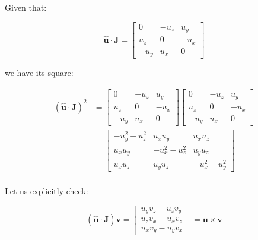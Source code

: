 \documentclass[12pt]{article}
\begin{document}



\pagebreak
\section*{}


Given that:

\begin{equation}
    \hat{\mathbf{u}} \cdot \mathbf{J} =
    \begin{bmatrix}
        0      & -u_{z} & u_{y}  \\
        u_{z}  & 0      & -u_{x} \\
        -u_{y} & u_{x}  & 0
    \end{bmatrix}
\end{equation}

we have its square:

\begin{equation}
    \begin{split}
        (\hat{\mathbf{u}} \cdot \mathbf{J})^{2} &=
        \begin{bmatrix}
            0      & -u_{z} & u_{y}  \\
            u_{z}  & 0      & -u_{x} \\
            -u_{y} & u_{x}  & 0
        \end{bmatrix}
        \begin{bmatrix}
            0      & -u_{z} & u_{y}  \\
            u_{z}  & 0      & -u_{x} \\
            -u_{y} & u_{x}  & 0
        \end{bmatrix} \\
        &=
        \begin{bmatrix}
            -u_{y}^{2} - u_{z}^{2} & u_{x}u_{y}             & u_{x}u_{z}             \\
            u_{x}u_{y}             & -u_{x}^{2} - u_{z}^{2} & u_{y}u_{z}             \\
            u_{x}u_{z}             & u_{y}u_{z}             & -u_{x}^{2} - u_{y}^{2}
        \end{bmatrix} \\
    \end{split}
\end{equation}

Let us explicitly check:

\begin{equation}
    (\hat{\mathbf{u}} \cdot \mathbf{J}) \mathbf{v} =
    \begin{bmatrix}
        u_{y}v_{z} - u_{z}v_{y} \\
        u_{z}v_{x} - u_{x}v_{z} \\
        u_{x}v_{y} - u_{y}v_{x}
    \end{bmatrix}
    =
    \mathbf{u} \times \mathbf{v}
\end{equation}
\end{document}
